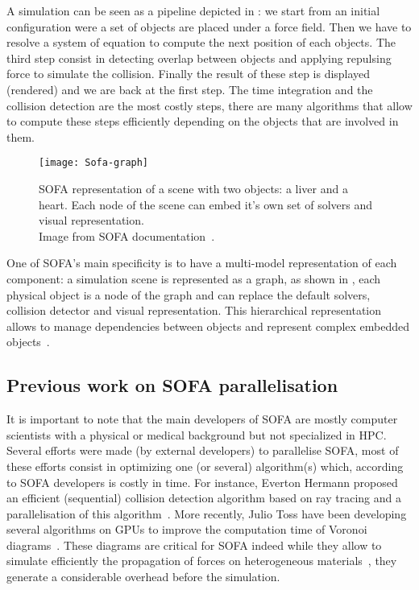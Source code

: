 A simulation can be seen as a pipeline depicted in : we
start from an initial configuration were a set of objects are placed under a
force field. Then we have to resolve a system of equation to compute the next
position of each objects. The third step consist in detecting overlap between
objects and applying repulsing force to simulate the collision.  Finally the
result of these step is displayed (rendered) and we are back at the first
step. The time integration and the collision detection are the most costly
steps, there are many algorithms that allow to compute these steps efficiently
depending on the objects that are involved in them.

\begin{figure}[htb]
    \centering
    \texttt{[image: Sofa-graph]}
    \caption[Example of SOFA scene graph]{SOFA representation of a scene with two objects: a liver and a
        heart. Each node of the scene can embed it's own set of solvers and
        visual representation.\\
        Image from SOFA documentation~\cite{SOFA16Sofa}.}
    \label{fig:sofa-tree}
\end{figure}

One of \gls{SOFA}'s main specificity is to have a multi-model representation
of each component: a simulation scene is represented as a graph, as shown in
, each physical object is a node of the graph and can replace
the default solvers, collision detector and visual representation. This
hierarchical representation allows to manage dependencies between objects and
represent complex embedded objects~\cite{Nesme09Preserving,Faure11Sparse}.

\subsection{Previous work on SOFA parallelisation}

It is important to note that the main developers of \gls{SOFA} are  mostly
computer scientists with a physical or medical background but not specialized in
\gls{HPC}. Several efforts were made (by external developers) to parallelise
\gls{SOFA}, most of these efforts consist in optimizing one (or several)
algorithm(s) which, according to \gls{SOFA} developers is costly in time. For
instance, Everton Hermann proposed an efficient (sequential) collision
detection algorithm based on ray tracing and a parallelisation of this
algorithm~\cite{Hermann08Raytraced}. More recently, Julio Toss have been developing
several algorithms on \glspl{GPU} to improve the computation time of Voronoi
diagrams~\cite{Toss13Parallel,Toss14Parallel}. These diagrams are critical for
\gls{SOFA} indeed while they allow to simulate efficiently the propagation
of forces on heterogeneous materials~\cite{Faure11Sparse}, they generate a
considerable overhead before the simulation.


